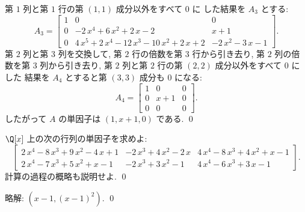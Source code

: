 \documentclass[12pt,twoside]{jarticle}
\newcommand\commentout[1]{#1}
\newcommand\commentout[1]{}
\begin{document}
\begin{example}
  第 $1$ 列と第 $1$ 行の第 $(1,1)$ 成分以外をすべて $0$ に
  した結果を $A_3$ とする:
  \begin{equation*}
    A_3 =  \left[ 
      \begin{array}{rcc}
        1 & 0 & 0 \\
        0 &  - 2\,{x}^{4} + 6\,{x}^{2} + 2\,{x} - 2 & {x} + 1 \\
        0 & 4\,{x}^{5} + 2\,{x}^{4} - 12\,{x}^{3} - 10\,{x}^{2} + 2\,{x}
        + 2 &  - 2\,{x}^{2} - 3\,{x} - 1
      \end{array}
    \right].
  \end{equation*}
  第 $2$ 列と第 $3$ 列を交換して,
  第 $2$ 行の倍数を第 $3$ 行から引き去り,
  第 $2$ 列の倍数を第 $3$ 列から引き去り,
  第 $2$ 列と第 $2$ 行の第 $(2,2)$ 成分以外をすべて $0$ にした
  結果を $A_4$ とすると第 $(3,3)$ 成分も $0$ になる:
  \begin{equation*}
    A_4 =  \left[ 
      \begin{array}{rcr}
        1 & 0 & 0 \\
        0 & {x} + 1 & 0 \\
        0 & 0 & 0
      \end{array}
    \right].
  \end{equation*}
  したがって $A$ の単因子は $(1,x+1,0)$ である. 
  \qed
\end{example}


\begin{question}
\label{q:ed-1}
  $\Q[x]$ 上の次の行列の単因子を求めよ:
  \begin{equation*}
    \left[ 
      \begin{array}{ccc}
        2\,{x}^{4} - 8\,{x}^{3} + 9\,{x}^{2} - 4\,{x} + 1 &  - 2\,{x}^{3}
        + 4\,{x}^{2} - 2\,{x} & 4\,{x}^{4} - 8\,{x}^{3} + 4\,{x}^{2} + {
          x} - 1 \\
        2\,{x}^{4} - 7\,{x}^{3} + 5\,{x}^{2} + {x} - 1 &  - 2\,{x}^{3} + 
        3\,{x}^{2} - 1 & 4\,{x}^{4} - 6\,{x}^{3} + 3\,{x} - 1
      \end{array}
    \right].
  \end{equation*}
  計算の過程の概略も説明せよ. \qed
\end{question}

\commentout{
\noindent
略解: $(x-1, (x-1)^2)$.
\qed
}

\end{document}
